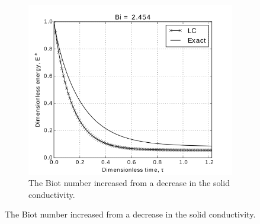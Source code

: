 \begin{figure}
        \centering
        \begin{subfigure}[b]{0.65\textwidth}
                \includegraphics[width=\textwidth]{chapters/figures/LC-analytic-sphere-in-fluid-Bi-2a}
                \caption{The Biot number increased from a decrease in the solid conductivity.}
				\label{fig:LC-analytic-sphere-in-fluid-Bi-2a}
        \end{subfigure}%
        

\end{figure}
